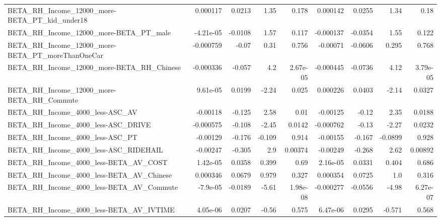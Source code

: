 \begin{tabular}{lrrrrrrrr}
BETA\_RH\_Income\_12000\_more-BETA\_PT\_kid\_under18      &    0.000117 &       0.0213 &      1.35 &    0.178 &   0.000142 &      0.0255 &         1.34 &          0.18 \\
BETA\_RH\_Income\_12000\_more-BETA\_PT\_male             &   -4.21e-05 &      -0.0108 &      1.57 &    0.117 &  -0.000137 &     -0.0354 &         1.55 &         0.122 \\
BETA\_RH\_Income\_12000\_more-BETA\_PT\_moreThanOneCar   &   -0.000759 &        -0.07 &      0.31 &    0.756 &   -0.00071 &     -0.0606 &        0.295 &         0.768 \\
BETA\_RH\_Income\_12000\_more-BETA\_RH\_Chinese          &   -0.000336 &       -0.057 &       4.2 & 2.67e-05 &  -0.000445 &     -0.0736 &         4.12 &      3.79e-05 \\
BETA\_RH\_Income\_12000\_more-BETA\_RH\_Commute          &    9.61e-05 &       0.0199 &     -2.24 &    0.025 &   0.000226 &      0.0403 &        -2.14 &        0.0327 \\
BETA\_RH\_Income\_4000\_less-ASC\_AV                    &    -0.00118 &       -0.125 &      2.58 &     0.01 &   -0.00125 &       -0.12 &         2.35 &        0.0188 \\
BETA\_RH\_Income\_4000\_less-ASC\_DRIVE                 &   -0.000575 &       -0.108 &     -2.45 &   0.0142 &  -0.000762 &       -0.13 &        -2.27 &        0.0232 \\
BETA\_RH\_Income\_4000\_less-ASC\_PT                    &    -0.00129 &       -0.176 &    -0.109 &    0.914 &   -0.00155 &      -0.167 &      -0.0899 &         0.928 \\
BETA\_RH\_Income\_4000\_less-ASC\_RIDEHAIL              &    -0.00247 &       -0.305 &       2.9 &  0.00374 &   -0.00249 &      -0.268 &         2.62 &       0.00892 \\
BETA\_RH\_Income\_4000\_less-BETA\_AV\_COST              &    1.42e-05 &       0.0358 &     0.399 &     0.69 &   2.16e-05 &      0.0331 &        0.404 &         0.686 \\
BETA\_RH\_Income\_4000\_less-BETA\_AV\_Chinese           &    0.000346 &       0.0679 &     0.979 &    0.327 &   0.000354 &      0.0725 &          1.0 &         0.316 \\
BETA\_RH\_Income\_4000\_less-BETA\_AV\_Commute           &    -7.9e-05 &      -0.0189 &     -5.61 & 1.98e-08 &  -0.000277 &     -0.0556 &        -4.98 &      6.27e-07 \\
BETA\_RH\_Income\_4000\_less-BETA\_AV\_IVTIME            &    4.05e-06 &       0.0207 &     -0.56 &    0.575 &   6.47e-06 &      0.0295 &       -0.571 &         0.568 \\

\end{tabular}
